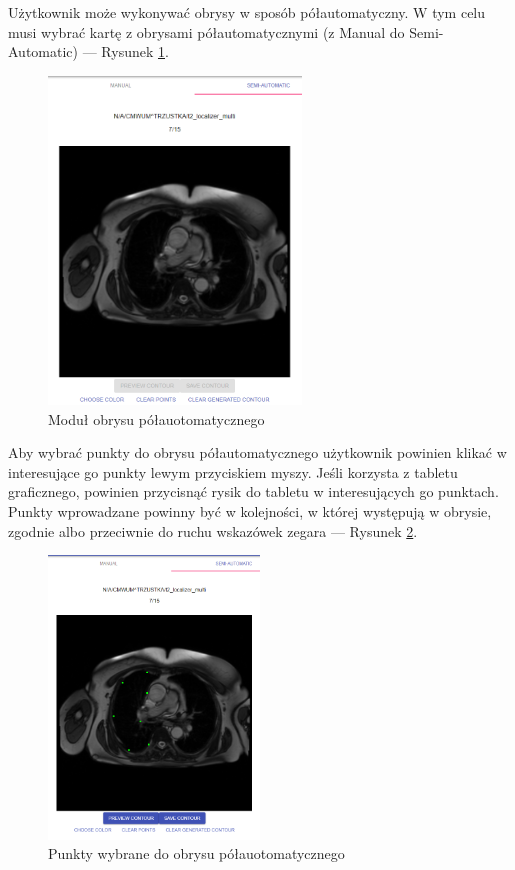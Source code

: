 \documentclass[a4paper,11pt,twoside,openright]{report}
\theoremstyle{definition}
\begin{document}
\begin{enumerate}
\pagebreak

Użytkownik może wykonywać obrysy w sposób półautomatyczny. W tym celu musi
wybrać kartę z obrysami półautomatycznymi (z Manual do Semi-Automatic) ---
Rysunek \ref{fig:10}.

\begin{figure}[h!]
	\center
	\includegraphics[width=0.6\textwidth]{10}
	\caption{Moduł obrysu półauotomatycznego}
    	\label{fig:10}
\end{figure}

Aby wybrać punkty do obrysu półautomatycznego użytkownik powinien klikać w
interesujące go punkty lewym przyciskiem myszy. Jeśli korzysta z tabletu
graficznego, powinien przycisnąć rysik do tabletu w interesujących go punktach.
Punkty wprowadzane powinny być w kolejności, w której występują w obrysie,
zgodnie albo przeciwnie do ruchu wskazówek zegara --- Rysunek \ref{fig:11}.

\pagebreak

\begin{figure}[h!]
	\center
	\includegraphics[width=0.5\textwidth]{11}
	\caption{Punkty wybrane do obrysu półauotomatycznego}
    	\label{fig:11}
\end{figure}


\end{enumerate}
\end{document}
